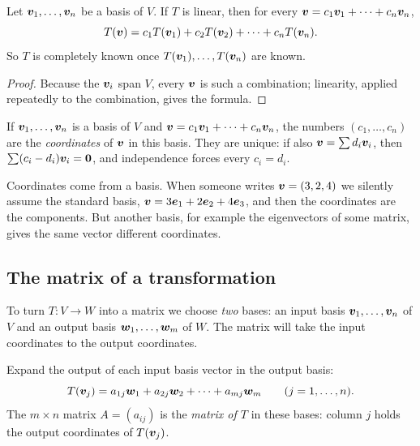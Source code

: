 \begin{theorem}\label{thm:u34-basis}
Let $\boldsymbol{v}_1,\dots,\boldsymbol{v}_n$ be a basis of $V$. If $T$ is linear, then for every $\boldsymbol{v}=c_1\boldsymbol{v}_1+\cdots+c_n\boldsymbol{v}_n$,
\[
  T(\boldsymbol{v})=c_1T(\boldsymbol{v}_1)+c_2T(\boldsymbol{v}_2)+\cdots+c_nT(\boldsymbol{v}_n).
\]
So $T$ is completely known once $T(\boldsymbol{v}_1),\dots,T(\boldsymbol{v}_n)$ are known.
\end{theorem}
\begin{proof}
Because the $\boldsymbol{v}_i$ span $V$, every $\boldsymbol{v}$ is such a combination; linearity, applied repeatedly to
the combination, gives the formula.
\end{proof}

\begin{definition}[Coordinates]\label{def:u34-coordinates}
If $\boldsymbol{v}_1,\dots,\boldsymbol{v}_n$ is a basis of $V$ and $\boldsymbol{v}=c_1\boldsymbol{v}_1+\cdots+c_n\boldsymbol{v}_n$, the numbers
$(c_1,\dots,c_n)$ are the \emph{coordinates} of $\boldsymbol{v}$ in this basis. They are unique: if also
$\boldsymbol{v}=\sum d_i\boldsymbol{v}_i$, then $\sum(c_i-d_i)\boldsymbol{v}_i=\boldsymbol{0}$, and independence forces every $c_i=d_i$.
\end{definition}

Coordinates come from a basis. When someone writes $\boldsymbol{v}=(3,2,4)$ we silently assume the
standard basis, $\boldsymbol{v}=3\boldsymbol{e}_1+2\boldsymbol{e}_2+4\boldsymbol{e}_3$, and then the coordinates are the components. But
another basis, for example the eigenvectors of some matrix, gives the same vector different
coordinates.

\subsection{The matrix of a transformation}

To turn $T\colon V\to W$ into a matrix we choose \emph{two} bases: an input basis $\boldsymbol{v}_1,\dots,\boldsymbol{v}_n$
of $V$ and an output basis $\boldsymbol{w}_1,\dots,\boldsymbol{w}_m$ of $W$. The matrix will take the input coordinates
to the output coordinates.

\begin{definition}\label{def:u34-matrix}
Expand the output of each input basis vector in the output basis:
\[
  T(\boldsymbol{v}_j)=a_{1j}\boldsymbol{w}_1+a_{2j}\boldsymbol{w}_2+\cdots+a_{mj}\boldsymbol{w}_m\qquad(j=1,\dots,n).
\]
The $m\times n$ matrix $A=(a_{ij})$ is the \emph{matrix of $T$} in these bases: column $j$ holds the
output coordinates of $T(\boldsymbol{v}_j)$.
\end{definition}

